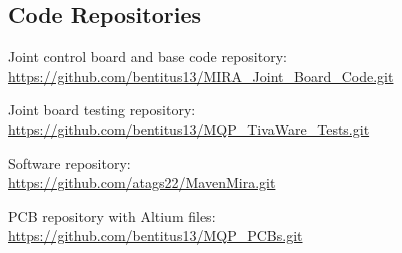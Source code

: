 \begin{flushleft}
\section{Code Repositories}
\end{flushleft}
\label{app:code_repo}
\raggedright
Joint control board and base code repository: \\
\url{https://github.com/bentitus13/MIRA_Joint_Board_Code.git}

Joint board testing repository: \\
\url{https://github.com/bentitus13/MQP_TivaWare_Tests.git}

Software repository: \\
\url{https://github.com/atags22/MavenMira.git}

PCB repository with Altium files: \\
\url{https://github.com/bentitus13/MQP_PCBs.git}